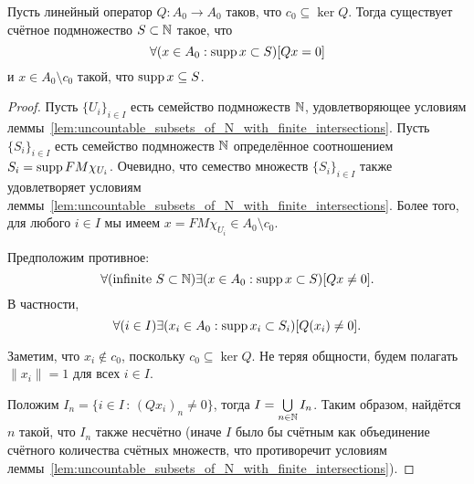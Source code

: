 \begin{lemma}
	\label{lem:c_0_not_complemented_in_A_0}
	Пусть линейный оператор  $Q: A_0 \to A_0$ таков, что $c_0\subseteq \ker Q$.
	Тогда существует счётное подмножество $S \subset \mathbb{N}$ такое, что
	\begin{equation}
		\forall(x \in A_0 : \operatorname{supp} x \subset S)[Qx = 0]
	\end{equation}
	и $x\in A_0\setminus c_0$ такой, что $\operatorname{supp} x \subseteq S$.
\end{lemma}

\begin{proof}
	Пусть $\{U_i\}_{i \in I}$ есть семейство подмножеств $\mathbb{N}$,
	удовлетворяющее условиям леммы~\ref{lem:uncountable_subsets_of_N_with_finite_intersections}.
	Пусть $\{S_i\}_{i \in I}$ есть семейство подмножеств $\mathbb{N}$
	определённое соотношением $S_i = \operatorname{supp} FM\chi_{U_i}$.
	Очевидно, что семество множеств $\{S_i\}_{i \in I}$ также
	удовлетворяет условиям леммы~\ref{lem:uncountable_subsets_of_N_with_finite_intersections}.
	Более того, для любого $i\in I$ мы имеем $x = FM\chi_{U_i} \in A_0\setminus c_0$.

	Предположим противное:
	\begin{equation}
		\forall(\mbox{infinite }S\subset\mathbb{N})\exists(x \in A_0 : \operatorname{supp} x \subset S)[Qx \neq 0]
		.
	\end{equation}
	В частности,
	\begin{equation}
		\forall(i\in I)\exists(x_i \in A_0 : \operatorname{supp} x_i \subset S_i)[Q(x_i) \neq 0]
		.
	\end{equation}

	Заметим, что $x_i \notin c_0$, поскольку $c_0\subseteq \ker Q$.
	Не теряя общности, будем полагать $\|x_i\|=1$ для всех $i \in I$.

	Положим $I_n = \{i \in I\,:\,(Qx_i)_n \neq 0\}$,
	тогда $I = \bigcup\limits_{n\in\mathbb{N}} I_n$.
	Таким образом, найдётся $n$ такой, что $I_n$ также несчётно
	(иначе $I$ было бы счётным как объединение счётного количества счётных множеств,
	что противоречит условиям леммы~\ref{lem:uncountable_subsets_of_N_with_finite_intersections}).


\end{proof}
